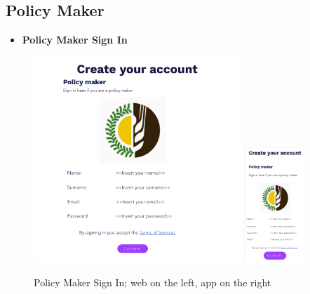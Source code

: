 \documentclass{article}
\begin{document}
        \newpage
        
    
    \subsection{Policy Maker}
    
    \begin{itemize}
        \item \textbf{Policy Maker Sign In}
    \end{itemize}
        \begin{figure} [h]
            \centering
            \includegraphics[width=0.7\textwidth]{images/UserInterfaces/PolicyMaker/PolicyMakerSignInWeb.png}
            \quad
            \includegraphics[width=0.2\textwidth]{images/UserInterfaces/PolicyMaker/PolicyMakerSignInApp.png}
            \quad
            \caption{\label{fig:policyMakerSignIn}Policy Maker Sign In; web on the left, app on the right}
        \end{figure}
    
    \newpage
\end{document}
